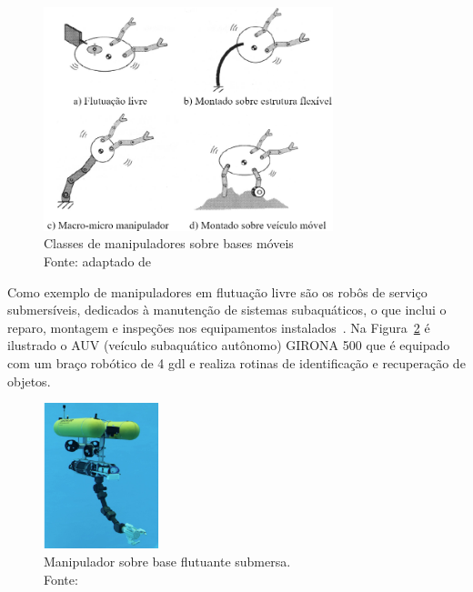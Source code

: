 \begin{figure}[h]
	\centering 
 	\includegraphics[width=0.75\textwidth]{figs/classes_bases}
 	\caption[Classes de manipuladores sobre bases móveis]{Classes de
 	manipuladores sobre bases móveis \\ Fonte: adaptado de
 	\cite{yoshida1996moving}}
 	\label{fig::classes_bases}
\end{figure}

Como exemplo de manipuladores em flutuação livre são os robôs de serviço
submersíveis, dedicados à manutenção de sistemas subaquáticos, o que inclui o
reparo, montagem e inspeções nos equipamentos
instalados~\cite{ridao2015intervention}.
Na Figura~\ref{fig::girona500} é ilustrado o AUV (veículo subaquático
autônomo) GIRONA 500 que é equipado com um braço robótico de 4 gdl e realiza
rotinas de identificação e recuperação de objetos.

\begin{figure}[h]
	\centering 
 	\includegraphics[width=0.30\textwidth]{figs/girona500}
 	\caption[Manipulador sobre base flutuante submersa]{Manipulador sobre base
 	flutuante submersa. \\ Fonte: \citet{ridao2015intervention}}
 	\label{fig::girona500}
\end{figure}

